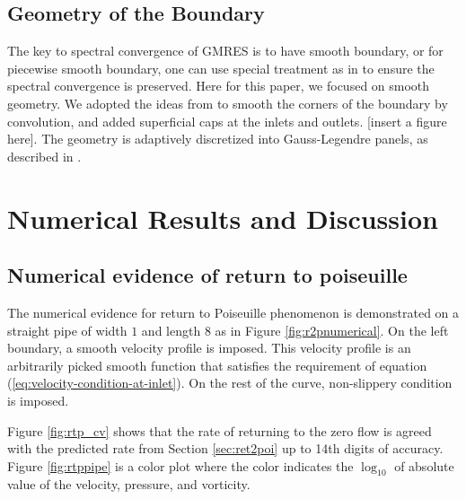 \documentclass[10pt,twocolumn]{article}
\begin{document}
\subsection{Geometry of the Boundary}

The key to spectral convergence of GMRES is to have smooth boundary, 
or for piecewise smooth boundary, one can use special treatment as in \cite{wuSolutionStokesFlow2020}
to ensure the spectral convergence is preserved. Here for this paper, we focused on smooth geometry. 
We adopted the ideas from 
\cite{epsteinSmoothedCornersScattered2016,baggeHighlyAccurateSpecial2021} 
to smooth the corners of the boundary by convolution, and added superficial caps at the 
inlets and outlets. [insert a figure here]. The geometry is adaptively discretized into Gauss-Legendre panels, as described in
\cite{wuSolutionStokesFlow2020}. 


\section{Numerical Results and Discussion\label{sec:numericalresults}}
\subsection{Numerical evidence of return to poiseuille}


The numerical evidence for return to Poiseuille phenomenon is 
demonstrated on a straight pipe of width $1$ and length $8$ as in Figure \ref{fig:r2pnumerical}. 
On the left boundary, a smooth velocity profile is imposed. 
This velocity profile is an arbitrarily picked smooth function that satisfies 
the requirement of equation (\ref{eq:velocity-condition-at-inlet}). 
On the rest of the curve, non-slippery condition is imposed.

Figure \ref{fig:rtp_cv} shows that the rate of returning 
to the zero flow is agreed with the 
predicted rate from Section \ref{sec:ret2poi} up to 14th digits of accuracy. 
Figure \ref{fig:rtppipe} is a color
plot where the color indicates the $\log_{10}$ of absolute value of the velocity, 
pressure, and vorticity. 
\end{document}
